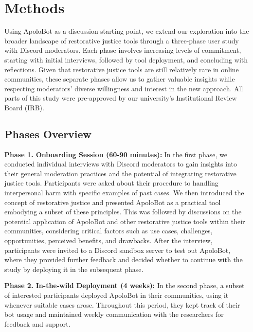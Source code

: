 \section{Methods}
Using ApoloBot as a discussion starting point, we extend our exploration into the broader landscape of restorative justice tools through a three-phase user study with Discord moderators. Each phase involves increasing levels of commitment, starting with initial interviews, followed by tool deployment, and concluding with reflections. Given that restorative justice tools are still relatively rare in online communities, these separate phases allow us to gather valuable insights while respecting moderators' diverse willingness and interest in the new approach. All parts of this study were pre-approved by our university's Institutional Review Board (IRB).

\subsection{Phases Overview}

\textbf{Phase 1. Onboarding Session (60-90 minutes):} In the first phase, we conducted individual interviews with Discord moderators to gain insights into their general moderation practices and the potential of integrating restorative justice tools. Participants were asked about their procedure to handling interpersonal harm with specific examples of past cases. We then introduced the concept of restorative justice and presented ApoloBot as a practical tool embodying a subset of these principles. This was followed by discussions on the potential application of ApoloBot and other restorative justice tools within their communities, considering critical factors such as use cases, challenges, opportunities, perceived benefits, and drawbacks. After the interview, participants were invited to a Discord sandbox server to test out ApoloBot, where they provided further feedback and decided whether to continue with the study by deploying it in the subsequent phase.

\textbf{Phase 2. In-the-wild Deployment (4 weeks):} In the second phase, a subset of interested participants deployed ApoloBot in their communities, using it whenever suitable cases arose. Throughout this period, they kept track of their bot usage and maintained weekly communication with the researchers for feedback and support.

